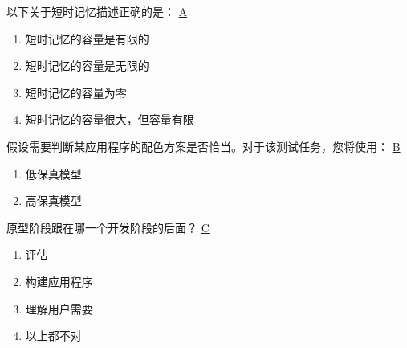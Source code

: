 \begin{problem}
	以下关于短时记忆描述正确的是：
	\uline{A}    
    \vspace{-0.8em}
    \begin{multicols}{2}
        \begin{enumerate}[label=\Alph*.]
            \item 短时记忆的容量是有限的
            \item 短时记忆的容量是无限的
            \item 短时记忆的容量为零
            \item 短时记忆的容量很大，但容量有限
        \end{enumerate}
    \end{multicols}
    \vspace{-1em}
\end{problem}



\begin{problem}
	假设需要判断某应用程序的配色方案是否恰当。对于该测试任务，您将使用：
	\uline{B}    
    \vspace{-0.8em}
    \begin{multicols}{2}
        \begin{enumerate}[label=\Alph*.]
            \item  低保真模型
            \item  高保真模型
        \end{enumerate}
    \end{multicols}
    \vspace{-1em}
\end{problem}



\begin{problem}
	原型阶段跟在哪一个开发阶段的后面？
	\uline{C}    
    \vspace{-0.8em}
    \begin{multicols}{4}
        \begin{enumerate}[label=\Alph*.]
            \item 评估
            \item 构建应用程序
            \item 理解用户需要
            \item 以上都不对
        \end{enumerate}
    \end{multicols}
    \vspace{-1em}
\end{problem}



